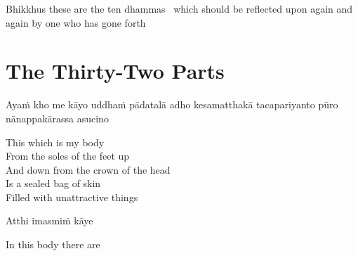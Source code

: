 \begin{english-hang}
  Bhikkhus these are the ten dhammas \breathmark\ which should be reflected upon again and again by one who has gone forth
\end{english-hang}

\suttaRef{[AN 10.48]}


\section{The Thirty-Two Parts}
\label{32-parts}

\begin{leader}
\end{leader}

\begin{pali-hang}
Ayaṁ kho me kāyo uddhaṁ pādatalā adho kesamatthakā tacapariyanto pūro nānappakārassa asucino
\end{pali-hang}

\begin{english-verses}
  This which is my body\\
  From the soles of the feet up\\
  And down from the crown of the head\\
  Is a sealed bag of skin\\
  Filled with unattractive things
\end{english-verses}

Atthi imasmiṁ kāye

\begin{english}
  In this body there are
\end{english}

